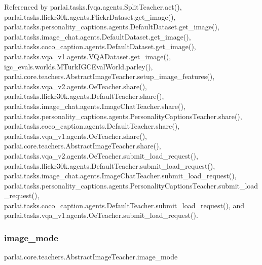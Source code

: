 Referenced by parlai.\+tasks.\+fvqa.\+agents.\+Split\+Teacher.\+act(), parlai.\+tasks.\+flickr30k.\+agents.\+Flickr\+Dataset.\+get\+\_\+image(), parlai.\+tasks.\+personality\+\_\+captions.\+agents.\+Default\+Dataset.\+get\+\_\+image(), parlai.\+tasks.\+image\+\_\+chat.\+agents.\+Default\+Dataset.\+get\+\_\+image(), parlai.\+tasks.\+coco\+\_\+caption.\+agents.\+Default\+Dataset.\+get\+\_\+image(), parlai.\+tasks.\+vqa\+\_\+v1.\+agents.\+V\+Q\+A\+Dataset.\+get\+\_\+image(), igc\+\_\+evals.\+worlds.\+M\+Turk\+I\+G\+C\+Eval\+World.\+parley(), parlai.\+core.\+teachers.\+Abstract\+Image\+Teacher.\+setup\+\_\+image\+\_\+features(), parlai.\+tasks.\+vqa\+\_\+v2.\+agents.\+Oe\+Teacher.\+share(), parlai.\+tasks.\+flickr30k.\+agents.\+Default\+Teacher.\+share(), parlai.\+tasks.\+image\+\_\+chat.\+agents.\+Image\+Chat\+Teacher.\+share(), parlai.\+tasks.\+personality\+\_\+captions.\+agents.\+Personality\+Captions\+Teacher.\+share(), parlai.\+tasks.\+coco\+\_\+caption.\+agents.\+Default\+Teacher.\+share(), parlai.\+tasks.\+vqa\+\_\+v1.\+agents.\+Oe\+Teacher.\+share(), parlai.\+core.\+teachers.\+Abstract\+Image\+Teacher.\+share(), parlai.\+tasks.\+vqa\+\_\+v2.\+agents.\+Oe\+Teacher.\+submit\+\_\+load\+\_\+request(), parlai.\+tasks.\+flickr30k.\+agents.\+Default\+Teacher.\+submit\+\_\+load\+\_\+request(), parlai.\+tasks.\+image\+\_\+chat.\+agents.\+Image\+Chat\+Teacher.\+submit\+\_\+load\+\_\+request(), parlai.\+tasks.\+personality\+\_\+captions.\+agents.\+Personality\+Captions\+Teacher.\+submit\+\_\+load\+\_\+request(), parlai.\+tasks.\+coco\+\_\+caption.\+agents.\+Default\+Teacher.\+submit\+\_\+load\+\_\+request(), and parlai.\+tasks.\+vqa\+\_\+v1.\+agents.\+Oe\+Teacher.\+submit\+\_\+load\+\_\+request().

\mbox{\label{classparlai_1_1core_1_1teachers_1_1AbstractImageTeacher_a72abb2921076e7597cc946275983028b}} 
\subsubsection{\texorpdfstring{image\+\_\+mode}{image\_mode}}
{\footnotesize\ttfamily parlai.\+core.\+teachers.\+Abstract\+Image\+Teacher.\+image\+\_\+mode}



